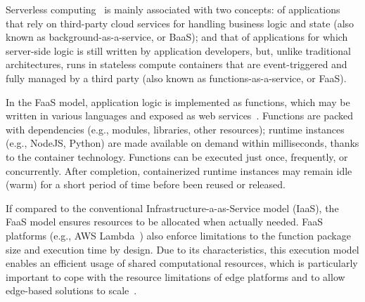 \documentclass[letterpaper, 10 pt, conference]{ieeeconf}  %
\begin{document}
Serverless computing~\cite{baldini2017serverless,Roberts:2018} is mainly associated with two concepts: of applications that rely on third-party cloud services for handling business logic and state (also known as background-as-a-service, or BaaS); and that of applications for which server-side logic is still written by application developers, but, unlike traditional architectures, runs in stateless compute containers that are event-triggered
and fully managed by a third party (also known as functions-as-a-service, or FaaS).

In the FaaS model, application logic is implemented as functions, which may be written in various languages and exposed as web services~\cite{}. Functions are packed with dependencies (e.g., modules, libraries, other resources); runtime instances (e.g., NodeJS, Python) are made available on demand within milliseconds, thanks to the container technology. Functions can be executed just once, frequently, or concurrently. After completion, containerized runtime instances may remain idle (warm) for a short period of time before been reused or released. 

If compared to the conventional Infrastructure-a-as-Service model (IaaS), the FaaS model ensures resources to be allocated when actually needed. FaaS platforms (e.g., AWS Lambda~\cite{AWSLambda}) also enforce limitations to the function package size and execution time by design. Due to its characteristics, this execution model enables an efficient usage of shared computational resources, which is particularly important to cope with the resource limitations of edge platforms and to allow edge-based solutions to scale~\cite{GarrigaMendonca2017}.





%



\end{document}
